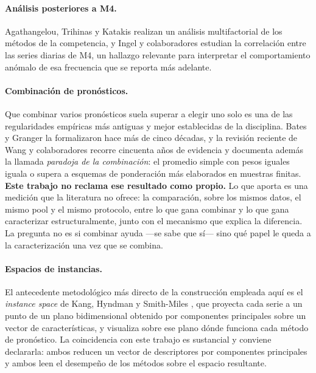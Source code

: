 \paragraph{Análisis posteriores a M4.} Agathangelou, Trihinas y Katakis
\cite{agathangelou2020} realizan un análisis multifactorial de los métodos de la
competencia, y Ingel y colaboradores \cite{ingel2020} estudian la correlación
entre las series diarias de M4, un hallazgo relevante para interpretar el
comportamiento anómalo de esa frecuencia que se reporta más adelante.

\paragraph{Combinación de pronósticos.} Que combinar varios pronósticos suela
superar a elegir uno solo es una de las regularidades empíricas más antiguas y mejor
establecidas de la disciplina. Bates y Granger \cite{bates1969} la formalizaron hace más
de cinco décadas, y la revisión reciente de Wang y colaboradores \cite{wang2023} recorre
cincuenta años de evidencia y documenta además la llamada \emph{paradoja de la
combinación}: el promedio simple con pesos iguales iguala o supera a esquemas de
ponderación más elaborados en muestras finitas. \textbf{Este trabajo no reclama ese
resultado como propio.} Lo que aporta es una medición que la literatura no ofrece: la
comparación, sobre los mismos datos, el mismo pool y el mismo protocolo, entre lo que
gana combinar y lo que gana caracterizar estructuralmente, junto con el mecanismo que
explica la diferencia. La pregunta no es si combinar ayuda ---se sabe que sí--- sino qué
papel le queda a la caracterización una vez que se combina.

\paragraph{Espacios de instancias.} El antecedente metodológico más directo de la
construcción empleada aquí es el \emph{instance space} de Kang, Hyndman y Smith-Miles
\cite{kang2017}, que proyecta cada serie a un punto de un plano bidimensional obtenido
por componentes principales sobre un vector de características, y visualiza sobre ese
plano dónde funciona cada método de pronóstico. La coincidencia con este trabajo es
sustancial y conviene declararla: ambos reducen un vector de descriptores por
componentes principales y ambos leen el desempeño de los métodos sobre el espacio
resultante.

